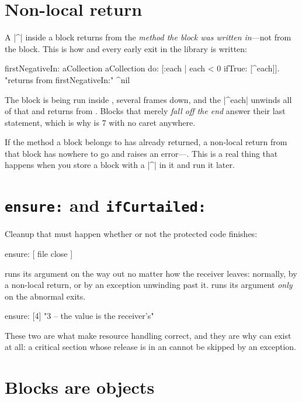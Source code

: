 \section{Non-local return}

A \ct|^| inside a block returns from the \emph{method the block was written
in}---not from the block. This is how  and every early exit
in the library is written:

\begin{st}
firstNegativeIn: aCollection
    aCollection do: [:each |
        each < 0 ifTrue: [^each]].       "returns from firstNegativeIn:"
    ^nil
\end{st}

The block is being run inside , several frames down, and the
\ct|^each| unwinds all of that and returns from
. Blocks that merely \emph{fall off the end} answer their
last statement, which is why  is 7 with no caret anywhere.

If the method a block belongs to has already returned, a non-local return from
that block has nowhere to go and raises an error---. This is
a real thing that happens when you store a block with a \ct|^| in it and
run it later.

\section{\texttt{ensure:} and \texttt{ifCurtailed:}}

Cleanup that must happen whether or not the protected code finishes:

\begin{st}
 ensure: [ file close ]
\end{st}

 runs its argument on the way out no matter how the receiver
leaves: normally, by a non-local return, or by an exception unwinding past it.
 runs its argument \emph{only} on the abnormal exits.

\begin{st}
[3] ensure: [4]                  "3 -- the value is the receiver's"
\end{st}

These two are what make resource handling correct, and they are why
 can exist at all: a critical section whose release is in an
 cannot be skipped by an exception.

\section{Blocks are objects}

